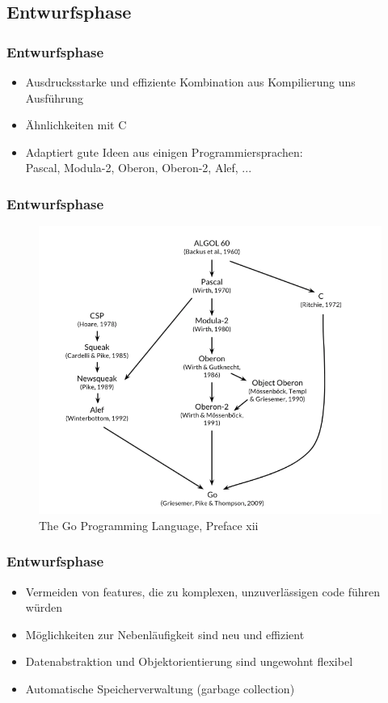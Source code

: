 \documentclass{beamer}
\begin{document}
\subsection{Entwurfsphase}
\begin{frame}
\frametitle{Entwurfsphase}

\begin{itemize}
\setlength{\itemsep}{40pt}
\item Ausdrucksstarke und effiziente Kombination aus Kompilierung uns Ausf\"uhrung
\item Ähnlichkeiten mit C
\item Adaptiert gute Ideen aus einigen Programmiersprachen: \\
Pascal, Modula-2, Oberon, Oberon-2, Alef, ...
\end{itemize}

\end{frame}

\begin{frame}
\frametitle{Entwurfsphase}

\begin{figure}
\centering
\includegraphics[scale=0.45]{origin.png}
\caption{The Go Programming Language,  Preface xii}
\end{figure}

\end{frame}

\begin{frame}
\frametitle{Entwurfsphase}

\begin{itemize}
\setlength{\itemsep}{40pt}
\item Vermeiden von features, die zu komplexen, unzuverl\"assigen code führen w\"urden
\item M\"oglichkeiten zur Nebenl\"aufigkeit sind neu und effizient
\item Datenabstraktion und Objektorientierung sind ungewohnt flexibel
\item Automatische Speicherverwaltung (garbage collection)
\end{itemize}

\end{frame}
\end{document}
